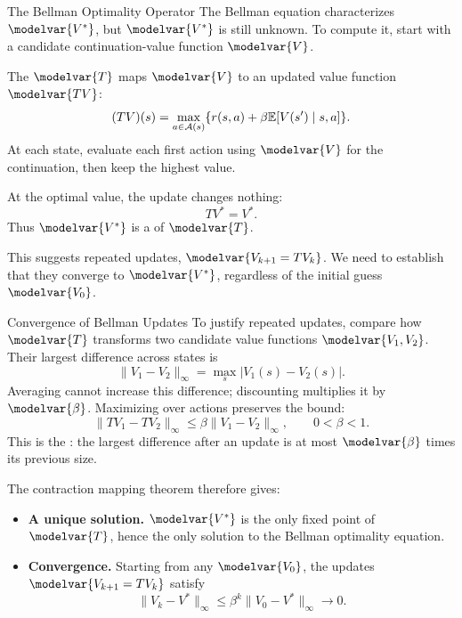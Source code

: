 \begin{frame}{The Bellman Optimality Operator}
\small
The Bellman equation characterizes \(\modelvar{V^*}\), but \(\modelvar{V^*}\) is still unknown. To compute it, start with a candidate continuation-value function \(\modelvar{V}\).
\par\medskip
The  \(\modelvar{T}\) maps \(\modelvar{V}\) to an updated value function \(\modelvar{TV}\):
\[(TV)(s)=\max_{a\in\mathcal A(s)}\{r(s,a)+\beta\mathbb E[V(s')\mid s,a]\}.\]
At each state, evaluate each first action using \(\modelvar{V}\) for the continuation, then keep the highest value.
\par\medskip
At the optimal value, the update changes nothing:
\[TV^*=V^*.\]
Thus \(\modelvar{V^*}\) is a  of \(\modelvar{T}\).
\par\medskip
This suggests repeated updates, \(\modelvar{V_{k+1}=TV_k}\). We need to establish that they converge to \(\modelvar{V^*}\), regardless of the initial guess \(\modelvar{V_0}\).
\end{frame}

\begin{frame}{Convergence of Bellman Updates}
\small
To justify repeated updates, compare how \(\modelvar{T}\) transforms two candidate value functions \(\modelvar{V_1,V_2}\). Their largest difference across states is
\[\|V_1-V_2\|_\infty=\max_s|V_1(s)-V_2(s)|.\]
Averaging cannot increase this difference; discounting multiplies it by \(\modelvar{\beta}\). Maximizing over actions preserves the bound:
\[\|TV_1-TV_2\|_\infty\leq\beta\|V_1-V_2\|_\infty,\qquad 0<\beta<1.\]
This is the : the largest difference after an update is at most \(\modelvar{\beta}\) times its previous size.
\par\medskip
The contraction mapping theorem therefore gives:
\begin{itemize}
\item \textbf{A unique solution.} \(\modelvar{V^*}\) is the only fixed point of \(\modelvar{T}\), hence the only solution to the Bellman optimality equation.
\item \textbf{Convergence.} Starting from any \(\modelvar{V_0}\), the updates \(\modelvar{V_{k+1}=TV_k}\) satisfy
\[\|V_k-V^*\|_\infty\leq\beta^k\|V_0-V^*\|_\infty\longrightarrow0.\]
\end{itemize}
\end{frame}

